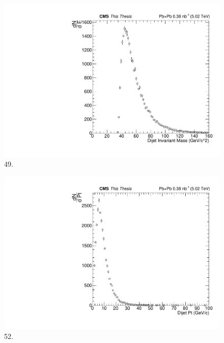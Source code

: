 \begin{figure}[h!]
\begin{centering}
\includegraphics[width=5in]{Chapter6/importfigs/49_thesis.pdf}
\par\end{centering}
\caption{49. \label{fig:49}}
\end{figure}

\begin{figure}[h!]
\begin{centering}
\includegraphics[width=5in]{Chapter6/importfigs/52_thesis.pdf}
\par\end{centering}
\caption{52. \label{fig:52}}
\end{figure}

